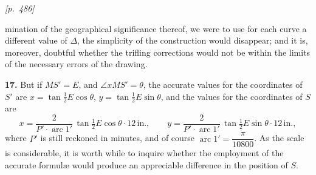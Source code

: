 \documentclass[11pt]{article}
\begin{document}
\medskip

\noindent\textit{[p.~486]}

\medskip

mination of the geographical significance thereof, we were to use for
each curve a different value of $\Delta$, the simplicity of the
construction would disappear; and it is, moreover, doubtful whether the
trifling corrections would not be within the limits of the necessary
errors of the drawing.

\medskip

\textbf{17.} But if $MS' = E$, and $\angle xMS' = \theta$, the accurate
values for the coordinates of $S'$ are $x = \tan\tfrac{1}{2}E\cos\theta$,
$y = \tan\tfrac{1}{2}E\sin\theta$, and the values for the coordinates of
$S$ are
\[
x = \frac{2}{P'\cdot\operatorname{arc}1'}\,\tan\tfrac{1}{2}E\cos\theta\cdot 12\,\text{in.},\qquad
y = \frac{2}{P'\cdot\operatorname{arc}1'}\,\tan\tfrac{1}{2}E\sin\theta\cdot 12\,\text{in.},
\]
where $P'$ is still reckoned in minutes, and of course
$\operatorname{arc}1' = \dfrac{\pi}{10800}$. As the scale is considerable,
it is worth while to inquire whether the employment of the accurate
formul\ae{} would produce an appreciable difference in the position of $S$.

\medskip
\end{document}

